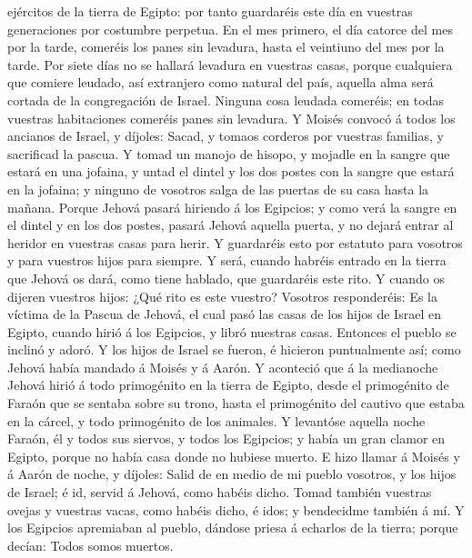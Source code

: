 ejércitos de la tierra de Egipto: por tanto guardaréis este día en
vuestras generaciones por costumbre perpetua.  En el mes
primero, el día catorce del mes por la tarde, comeréis los panes sin
levadura, hasta el veintiuno del mes por la tarde.  Por
siete días no se hallará levadura en vuestras casas, porque cualquiera
que comiere leudado, así extranjero como natural del país, aquella alma
será cortada de la congregación de Israel.  Ninguna cosa
leudada comeréis; en todas vuestras habitaciones comeréis panes sin
levadura.  Y Moisés convocó á todos los ancianos de Israel,
y díjoles: Sacad, y tomaos corderos por vuestras familias, y sacrificad
la pascua.  Y tomad un manojo de hisopo, y mojadle en la
sangre que estará en una jofaina, y untad el dintel y los dos postes con
la sangre que estará en la jofaina; y ninguno de vosotros salga de las
puertas de su casa hasta la mañana.  Porque Jehová pasará
hiriendo á los Egipcios; y como verá la sangre en el dintel y en los dos
postes, pasará Jehová aquella puerta, y no dejará entrar al heridor en
vuestras casas para herir.  Y guardaréis esto por estatuto
para vosotros y para vuestros hijos para siempre.  Y será,
cuando habréis entrado en la tierra que Jehová os dará, como tiene
hablado, que guardaréis este rito.  Y cuando os dijeren
vuestros hijos: ¿Qué rito es este vuestro?  Vosotros
responderéis: Es la víctima de la Pascua de Jehová, el cual pasó las
casas de los hijos de Israel en Egipto, cuando hirió á los Egipcios, y
libró nuestras casas. Entonces el pueblo se inclinó y adoró.
 Y los hijos de Israel se fueron, é hicieron puntualmente
así; como Jehová había mandado á Moisés y á Aarón.  Y
aconteció que á la medianoche Jehová hirió á todo primogénito en la
tierra de Egipto, desde el primogénito de Faraón que se sentaba sobre su
trono, hasta el primogénito del cautivo que estaba en la cárcel, y todo
primogénito de los animales.  Y levantóse aquella noche
Faraón, él y todos sus siervos, y todos los Egipcios; y había un gran
clamor en Egipto, porque no había casa donde no hubiese muerto.
 E hizo llamar á Moisés y á Aarón de noche, y díjoles:
Salid de en medio de mi pueblo vosotros, y los hijos de Israel; é id,
servid á Jehová, como habéis dicho.  Tomad también vuestras
ovejas y vuestras vacas, como habéis dicho, é idos; y bendecidme también
á mí.  Y los Egipcios apremiaban al pueblo, dándose priesa
á echarlos de la tierra; porque decían: Todos somos muertos.
